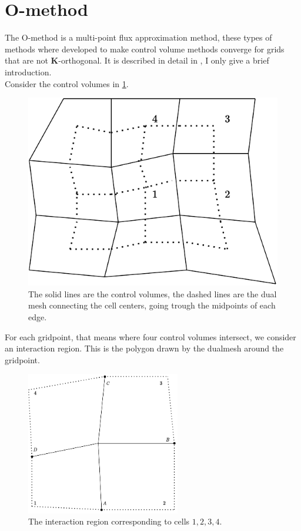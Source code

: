 \documentclass[../Main/main.tex]{subfiles}
\begin{document}
\section*{O-method}
The O-method is a multi-point flux approximation method, these types of methods where developed to make control volume methods converge for grids that are not $\pmb{K}$-orthogonal. It is described in detail in  \cite{Aavatsmark2002}, I only give a brief introduction.
\\
Consider the control volumes in \ref{fig:dualmesh}.
\begin{figure}[H]
	\centering
	\includegraphics{dualmesh.pdf}
	
	\caption{The solid lines are the control volumes, the dashed lines are the dual mesh connecting the cell centers, going trough the midpoints of each edge.}
	\label{fig:dualmesh}
\end{figure}
For each gridpoint, that means where four control volumes intersect, we consider an interaction region. This is the polygon drawn by the dualmesh around the gridpoint.
\begin{figure}[H]
	\centering
	\includegraphics[width=0.6\textwidth]{Interaction region.pdf}
	\caption{The interaction region corresponding to cells $1,2,3,4$.}
	\label{fig:interactionregion}
\end{figure}
\end{document}
